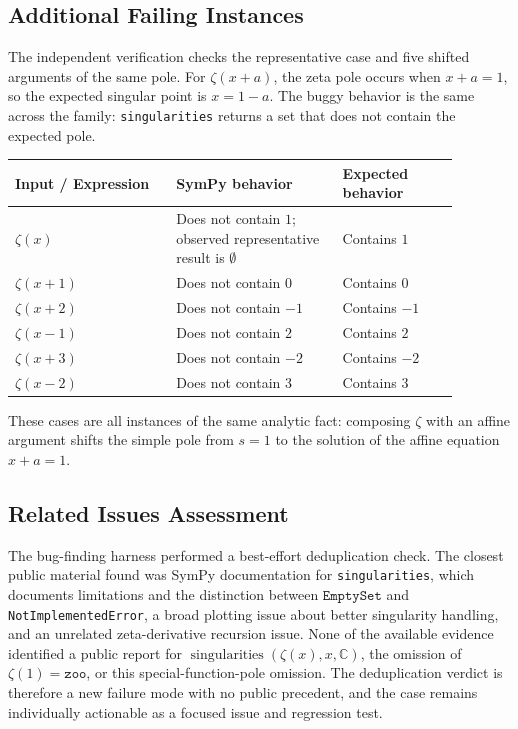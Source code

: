\documentclass[11pt]{article}
\begin{document}
\subsection{Additional Failing Instances}

The independent verification checks the representative case and five shifted arguments of the same pole. For \(\zeta(x+a)\), the zeta pole occurs when \(x+a=1\), so the expected singular point is \(x=1-a\). The buggy behavior is the same across the family: \texttt{singularities} returns a set that does not contain the expected pole.

\begin{center}
\small
\renewcommand{\arraystretch}{1.3}
\begin{tabular}{@{}>{\raggedright\arraybackslash}p{0.32\linewidth}>{\raggedright\arraybackslash}p{0.33\linewidth}>{\raggedright\arraybackslash}p{0.23\linewidth}@{}}
\toprule
\textbf{Input / Expression} & \textbf{SymPy behavior} & \textbf{Expected behavior} \\
\midrule
\(\zeta(x)\) & Does not contain \(1\); observed representative result is \(\emptyset\) & Contains \(1\) \\
\(\zeta(x+1)\) & Does not contain \(0\) & Contains \(0\) \\
\(\zeta(x+2)\) & Does not contain \(-1\) & Contains \(-1\) \\
\(\zeta(x-1)\) & Does not contain \(2\) & Contains \(2\) \\
\(\zeta(x+3)\) & Does not contain \(-2\) & Contains \(-2\) \\
\(\zeta(x-2)\) & Does not contain \(3\) & Contains \(3\) \\
\bottomrule
\end{tabular}
\end{center}

These cases are all instances of the same analytic fact: composing \(\zeta\) with an affine argument shifts the simple pole from \(s=1\) to the solution of the affine equation \(x+a=1\).

\subsection{Related Issues Assessment}

The bug-finding harness performed a best-effort deduplication check. The closest public material found was SymPy documentation for \texttt{singularities}, which documents limitations and the distinction between \(\mathtt{EmptySet}\) and \texttt{NotImplementedError}, a broad plotting issue about better singularity handling, and an unrelated zeta-derivative recursion issue. None of the available evidence identified a public report for \(\operatorname{singularities}(\zeta(x), x, \mathbb{C})\), the omission of \(\zeta(1)=\mathtt{zoo}\), or this special-function-pole omission. The deduplication verdict is therefore a new failure mode with no public precedent, and the case remains individually actionable as a focused issue and regression test.
\end{document}
